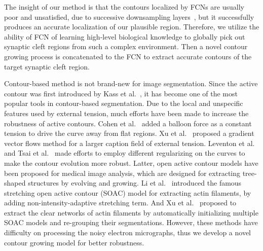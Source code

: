 


The insight of our method is that the contours localized by FCNs are usually poor and unsatisfied, due to successive downsampling layers~\cite{Chen2017}, but it successfully produces an accurate localization of our plausible region.
%
Therefore, we utilize the ability of FCN of learning high-level biological knowledge to globally pick out synaptic cleft regions from such a complex environment.
%
Then a novel contour growing process is concatenated to the FCN to extract accurate contours of the target synaptic cleft region.
%

Contour-based method is not brand-new for image segmentation.
Since the active contour was first introduced by Kass et al.~\cite{Kass1988}, it has become one of the most popular tools in contour-based segmentation.
Due to the local and unspecific features used by external tension, much efforts have been made to increase the robustness of active contours.
Cohen et al.~\cite{Cohen1991} added a balloon force as a constant tension to drive the curve away from flat regions.
Xu et al.~\cite{Xu1998} proposed a gradient vector flows method for a larger caption field of external tension.
Leventon et al.~\cite{Leventon2003Statistical} and Tsai et al.~\cite{Tsai2003A} made efforts to employ different regularizing on the curves to make the contour evolution more robust.
Latter, open active contour models have been proposed for medical image analysis, which are designed for extracting tree-shaped structures \cite{Li2009Actin,Xu2013EXTRACTION} by evolving and growing.
Li et al.~\cite{Li2009Actin} introduced the famous stretching open active contour (SOAC) model for extracting actin filaments, by adding non-intensity-adaptive stretching term.
And Xu et al.~\cite{Xu2013EXTRACTION} proposed to extract the clear networks of actin filaments by automatically initializing multiple SOAC models and re-grouping their segmentations.
However, these methods have difficulty on processing the noisy electron micrographs, thus we develop a novel contour growing model for better robustness.

